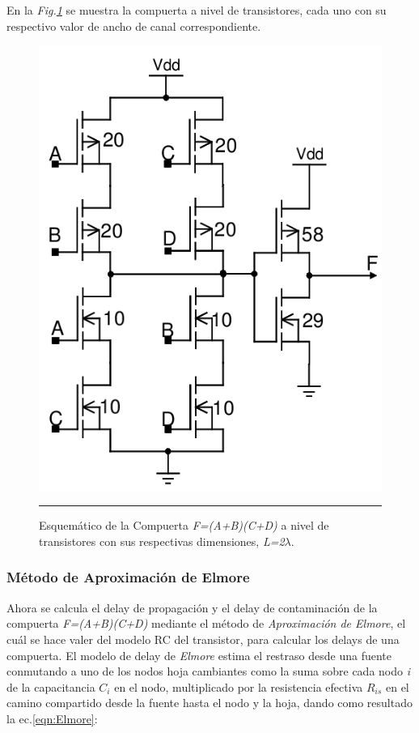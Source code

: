 \documentclass[12pt,a4paper]{article} %
\begin{document}
En la \textit{Fig.\ref{fig:Comp_Transistores_Dim}} se muestra la compuerta a nivel de transistores, cada uno con su respectivo valor de ancho de canal correspondiente.\\

\begin{figure}[htbp]
  \centering
    \includegraphics[scale=0.45]{./Comp_Transistores_Dim.png}
    \rule{35em}{0.5pt}
  \caption[Delay]{Esquemático de la Compuerta \textit{F=(A+B)(C+D)} a nivel de transistores con sus respectivas dimensiones, \textit{L=2$\lambda$}.}
  \label{fig:Comp_Transistores_Dim}
\end{figure}

\subsubsection{Método de Aproximación de Elmore}

Ahora se calcula el delay de propagación y el delay de contaminación de la compuerta \textit{F=(A+B)(C+D)} mediante el método de \textit{Aproximación de Elmore}, el cuál se hace valer del modelo RC del transistor, para calcular los delays de una compuerta. El modelo de delay de \textit{Elmore} estima el restraso desde una fuente conmutando a uno de los nodos hoja cambiantes como la suma sobre cada nodo \textit{i} de la capacitancia \textit{$C_{i}$} en el nodo, multiplicado por la resistencia efectiva \textit{$R_{is}$} en el camino compartido desde la fuente hasta el nodo y la hoja, dando como resultado la ec.\ref{eqn:Elmore}:
\end{document}
